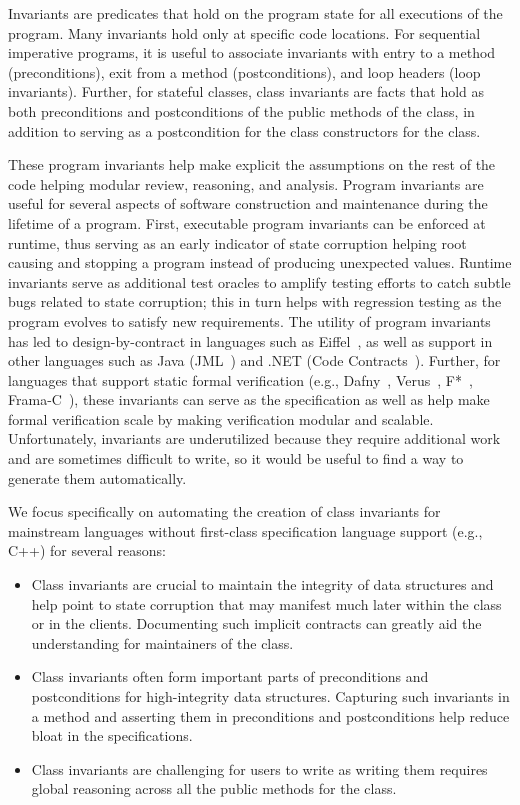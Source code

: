 Invariants are predicates that hold on the program state for all executions of the program. Many invariants hold only at specific code locations.
For sequential imperative programs, it is useful to associate invariants with entry to a method (preconditions), exit from a method (postconditions), and loop headers (loop invariants).
Further, for stateful classes, class invariants are facts that hold as both preconditions and postconditions of the public methods of the class, in addition to serving as a postcondition for the class constructors for the class. 

These program invariants help make explicit the assumptions on the rest of the code helping modular review, reasoning, and analysis. 
Program invariants are useful for several aspects of software construction and maintenance during the lifetime of a program.
First, executable program invariants can be enforced at runtime, thus serving as an early indicator of state corruption helping root causing and stopping a program instead of producing unexpected values. 
Runtime invariants serve as additional test oracles to amplify testing efforts to catch subtle bugs related to state corruption; this in turn helps with regression testing as the program evolves to satisfy new requirements. 
The utility of program invariants has led to design-by-contract in languages such as Eiffel~\cite{meyer1992eiffel}, as well as support in other languages such as Java (JML~\cite{jml}) and .NET (Code Contracts~\cite{fahndrich2010static}). 
Further, for languages that support static formal verification (e.g., Dafny~\cite{leino2010dafny}, Verus~\cite{verus}, F*~\cite{swamy2011secure}, Frama-C~\cite{kirchner2015frama}), these invariants can serve as the specification as well as help make formal verification scale by making verification modular and scalable. Unfortunately, invariants are underutilized because they require additional work and are sometimes difficult to write, so it would be useful to find a way to generate them automatically.

We focus specifically on automating the creation of class invariants for mainstream languages without first-class specification language support (e.g., C++) for several reasons:
\begin{itemize}
\item Class invariants are crucial to maintain the integrity of data structures and help point to state corruption that may manifest much later within the class or in the clients.
Documenting such implicit contracts can greatly aid the understanding for maintainers of the class. 
\item Class invariants often form important parts of preconditions and postconditions for high-integrity data structures. Capturing such invariants in a method and asserting them in preconditions and postconditions help reduce bloat in the specifications. 
\item Class invariants are challenging for users to write as writing them requires global reasoning across all the public methods for the class. 
\end{itemize}

